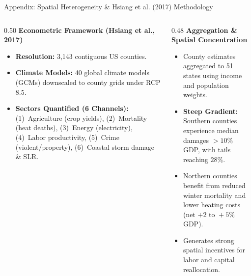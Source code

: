 \documentclass[aspectratio=169, 10pt]{beamer}
\begin{document}
\begin{frame}{Appendix: Spatial Heterogeneity \& Hsiang et al. (2017) Methodology \hfill \hyperlink{main:fact2}{\scriptsize{}}}\label{backup:hsiang_method}
    \begin{columns}[T]
        \begin{column}{0.50\textwidth}
            \textbf{\small Econometric Framework (Hsiang et al., 2017)}
            \vspace{0.05cm}
            \begin{itemize}\scriptsize\setlength{\itemsep}{2pt}
                \item \textbf{Resolution:} 3,143 contiguous US counties.
                \item \textbf{Climate Models:} 40 global climate models (GCMs) downscaled to county grids under RCP 8.5.
                \item \textbf{Sectors Quantified (6 Channels):} (1)~Agriculture (crop yields), (2)~Mortality (heat deaths), (3)~Energy (electricity), (4)~Labor productivity, (5)~Crime (violent/property), (6)~Coastal storm damage \& SLR.
            \end{itemize}
        \end{column}
        
        \begin{column}{0.48\textwidth}
            \textbf{\small Aggregation \& Spatial Concentration}
            \vspace{0.05cm}
            \begin{itemize}\scriptsize\setlength{\itemsep}{2pt}
                \item County estimates aggregated to 51 states using income and population weights.
                \item \textbf{Steep Gradient:} Southern counties experience median damages $>10\%$ GDP, with tails reaching $28\%$.
                \item Northern counties benefit from reduced winter mortality and lower heating costs (net $+2\text{ to }+5\%$ GDP).
                \item Generates strong spatial incentives for labor and capital reallocation.
            \end{itemize}
        \end{column}
    \end{columns}
\end{frame}
\end{document}
